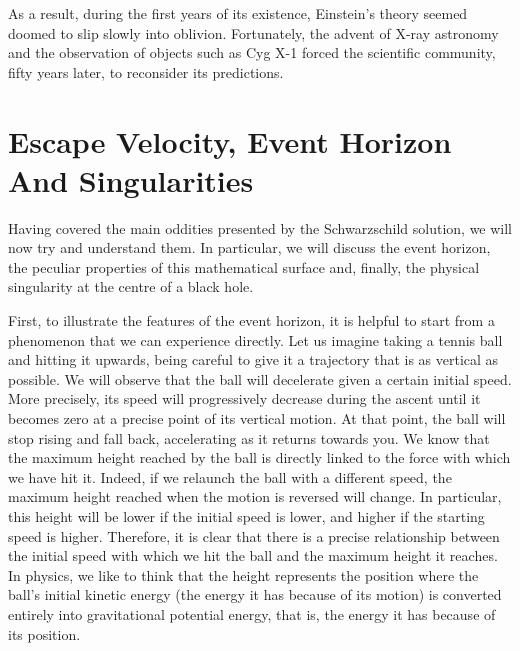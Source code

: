 As a result, during the first years of its existence, Einstein's theory seemed doomed to
slip slowly into oblivion. Fortunately, the advent of X-ray astronomy
and the observation of objects such as Cyg X-1 forced the scientific
community, fifty years later, to reconsider its predictions.

\section{Escape Velocity, Event Horizon And Singularities}\label{sec:06-escape}

Having covered the main oddities presented by the Schwarzschild solution, we will now
try and understand them. In particular, we will discuss the event horizon, the peculiar
properties of this mathematical surface and, finally, the physical
singularity at the centre of a black hole.

First, to illustrate the features of the event horizon, it is helpful
to start from a phenomenon that we can experience directly. Let us imagine taking a
tennis ball and hitting it upwards, being careful to give it a trajectory that is as
vertical as possible. We will observe that the ball will decelerate given a certain
initial speed. More precisely, its speed will progressively decrease during the ascent
until it becomes zero at a precise point of its vertical motion. At that point, the ball
will stop rising and fall back, accelerating as it returns towards you. We know that the
maximum height reached by the ball is directly linked to the force with which we have
hit it. Indeed, if we relaunch the ball with a different speed, the maximum height
reached when the motion is reversed will change. In particular, this height will be
lower if the initial speed is lower, and higher if the starting speed is higher.
Therefore, it is clear that there is a precise relationship between the initial speed
with which we hit the ball and the maximum height it reaches. In physics, we like to
think that the height represents the position where the ball's initial kinetic energy
(the energy it has because of its motion) is converted entirely into gravitational
potential energy, that is, the energy it has because of its position.


